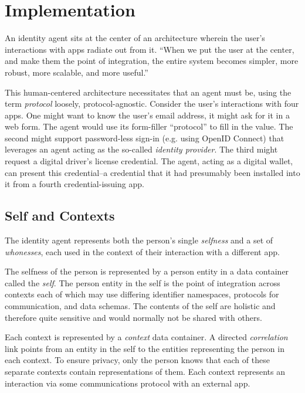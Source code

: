 \documentclass[11pt, oneside]{article}   	%
\begin{document}

\section{Implementation} %

An identity agent sits at the center of an architecture wherein the user's interactions with apps radiate out from it. ``When we put the user at the center, and make them the point of integration, the entire system becomes simpler, more robust, more scalable, and more useful.''\cite{Andrieu2007}

This human-centered architecture necessitates that an agent must be, using the term \emph{protocol} loosely, protocol-agnostic. Consider the user's interactions with four apps. One might want to know the user's email address, it might ask for it in a web form. The agent would use its form-filler ``protocol'' to fill in the value. The second might support password-less sign-in (e.g. using OpenID Connect) that leverages an agent acting as the so-called \emph{identity provider}. The third might request a digital driver's license credential. The agent, acting as a digital wallet, can present this credential--a credential that it had presumably been installed into it from a fourth credential-issuing app. 

\subsection{Self and Contexts}

The identity agent represents both the person's single \emph{selfness} and a set of \emph{whonesses}, each used in the context of their interaction with a different app.

The selfness of the person is represented by a person entity in a data container called the \emph{self}. The person entity in the self is the point of integration across contexts each of which may use differing identifier namespaces, protocols for communication, and data schemas. The contents of the self are holistic and therefore quite sensitive and would normally not be shared with others. 

Each context is represented by a \emph{context} data container. A directed \emph{correlation} link points from an entity in the self to the entities representing the person in each context. To ensure privacy, only the person knows that each of these separate contexts contain representations of them. Each context represents an interaction via some communications protocol with an external app. 
\end{document}
